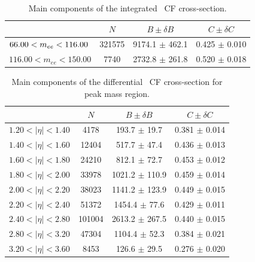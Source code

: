 \begin{table}
\centering
\begin{tabular}{lccc}
\hline
    &   $N$   & $B \pm \delta B$  &  $C \pm \delta C$ \\
\hline
$\hfill 66.00 < m_{ee} <116.00$       & 321575     & 9174.1     $\pm$ 462.1 & 0.425      $\pm$ 0.010 \\
$116.00 < m_{ee} <150.00$      & 7740       & 2732.8     $\pm$ 261.8 & 0.520      $\pm$ 0.018 \\
\hline
\end{tabular}
\caption{Main components of the integrated \Zee\ CF cross-section.}
\label{tab:Zee_NBC}
\end{table}

\begin{table}
\centering
\begin{tabular}{lccc}
\hline
    &   $N$   & $B \pm \delta B$  &  $C \pm \delta C$ \\
\hline
$1.20 < |\eta| <1.40$          & 4178       & 193.7      $\pm$ 19.7 & 0.381      $\pm$ 0.014 \\
$1.40 < |\eta| <1.60$          & 12404      & 517.7      $\pm$ 47.4 & 0.436      $\pm$ 0.013 \\
$1.60 < |\eta| <1.80$          & 24210      & 812.1      $\pm$ 72.7 & 0.453      $\pm$ 0.012 \\
$1.80 < |\eta| <2.00$          & 33978      & 1021.2     $\pm$ 110.9 & 0.459      $\pm$ 0.014 \\
$2.00 < |\eta| <2.20$          & 38023      & 1141.2     $\pm$ 123.9 & 0.449      $\pm$ 0.015 \\
$2.20 < |\eta| <2.40$          & 51372      & 1454.4     $\pm$ 77.6 & 0.429      $\pm$ 0.011 \\
$2.40 < |\eta| <2.80$          & 101004     & 2613.2     $\pm$ 267.5 & 0.440      $\pm$ 0.015 \\
$2.80 < |\eta| <3.20$          & 47304      & 1104.4     $\pm$ 52.3 & 0.384      $\pm$ 0.021 \\
$3.20 < |\eta| <3.60$          & 8453       & 126.6      $\pm$ 29.5 & 0.276      $\pm$ 0.020 \\
\hline
\end{tabular}
\caption{Main components of the differential \Zee\ CF cross-section for peak mass region.}
\label{tab:Zee_NBC_peak}
\end{table}


